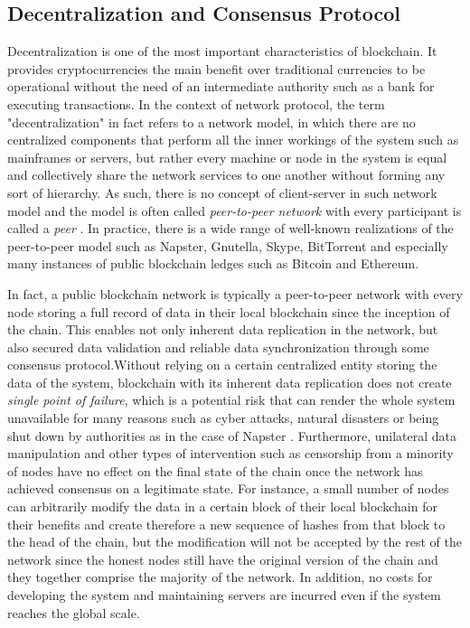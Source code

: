 \subsection{Decentralization and Consensus Protocol}

Decentralization is one of the most important characteristics of blockchain. It provides cryptocurrencies the main benefit over traditional currencies to be operational without the need of an intermediate authority such as a bank for executing transactions. In the context of network protocol, the term "decentralization" in fact refers to a network model, in which there are no centralized components that perform all the inner workings of the system such as mainframes or servers, but rather every machine or node in the system is equal and collectively share the network services to one another without forming any sort of hierarchy. As such, there is no concept of client-server in such network model and the model is often called \textit{peer-to-peer network} with every participant is called a \textit{peer} \cite{fox2001peer}. In practice, there is a wide range of well-known realizations of the peer-to-peer model such as Napster, Gnutella, Skype, BitTorrent and especially many instances of public blockchain ledges such as Bitcoin and Ethereum.


In fact, a public blockchain network is typically a peer-to-peer network with every node storing a full record of data in their local blockchain since the inception of the chain. This enables not only inherent data replication in the network, but also secured data validation and reliable data synchronization through some consensus protocol.Without relying on a certain centralized entity storing the data of the system, blockchain with its inherent data replication does not create \textit{single point of failure}, which is a potential risk that can render the whole system unavailable for many reasons such as cyber attacks, natural disasters or being shut down by authorities as in the case of Napster \cite{stern2000napster}. Furthermore, unilateral data manipulation and other types of intervention such as censorship from a minority of nodes have no effect on the final state of the chain once the network has achieved consensus on a legitimate state. For instance, a small number of nodes can arbitrarily modify the data in a certain block of their local blockchain for their benefits and create therefore a new sequence of hashes from that block to the head of the chain, but the modification will not be accepted by the rest of the network since the honest nodes still have the original version of the chain and they together comprise the majority of the network. In addition, no costs for developing the system and maintaining servers are incurred even if the system reaches the global scale.

